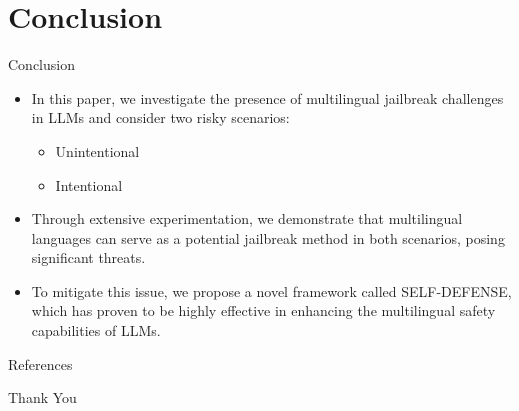 \section{Conclusion}

\begin{frame}{Conclusion}
    \begin{itemize}
        \item In this paper, we investigate the presence of multilingual jailbreak challenges in LLMs and consider two risky scenarios: 
        \begin{itemize}
            \item Unintentional
            \item Intentional
        \end{itemize}
        \item Through extensive experimentation, we demonstrate that multilingual languages can serve as a potential jailbreak method in both scenarios, posing significant threats.
        \item To mitigate this issue, we propose a novel framework called SELF-DEFENSE, which has proven to be highly effective in enhancing the multilingual safety capabilities of LLMs.
    \end{itemize}
\end{frame}


\begin{frame}{References}
    
    
    \nocite{*}
\end{frame}


\begin{frame}
    \begin{center}
        {\Huge\calligra Thank You}
    \end{center}
\end{frame}